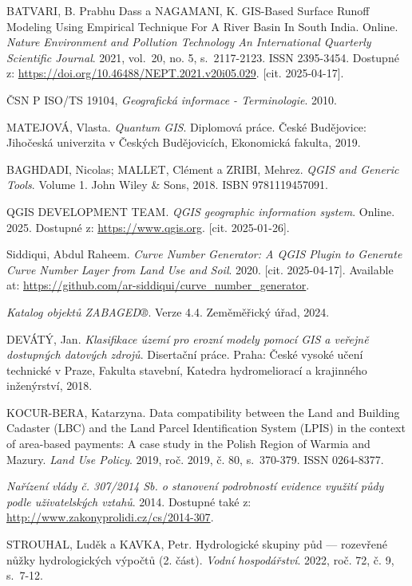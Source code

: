 \documentclass[a4paper,oneside,12pt]{book}
\begin{document}
\begin{thebibliography}{1}
BATVARI, B. Prabhu Dass a NAGAMANI, K. GIS-Based Surface Runoff Modeling Using Empirical Technique For A River Basin In South India. Online. \textit{Nature Environment and Pollution Technology An International Quarterly Scientific Journal}. 2021, vol.~20, no. 5, s.~2117-2123. ISSN 2395-3454. Dostupné z: \url{https://doi.org/10.46488/NEPT.2021.v20i05.029}. [cit. 2025-04-17].


ČSN P ISO/TS 19104, \textit{Geografická informace - Terminologie}. 2010.

MATEJOVÁ, Vlasta. \textit{Quantum GIS}. Diplomová práce. České Budějovice: Jihočeská univerzita v Českých Budějovicích, Ekonomická fakulta, 2019.

BAGHDADI, Nicolas; MALLET, Clément a ZRIBI, Mehrez. \textit{QGIS and Generic Tools}. Volume 1. John Wiley \& Sons, 2018. ISBN 9781119457091.

QGIS DEVELOPMENT TEAM. \textit{QGIS geographic information system}. Online. 2025. Dostupné z: \url{https://www.qgis.org}. [cit. 2025-01-26].

Siddiqui, Abdul Raheem. \textit{Curve Number Generator: A QGIS Plugin to Generate Curve Number Layer from Land Use and Soil}. 2020. [cit. 2025-04-17]. Available at: \url{https://github.com/ar-siddiqui/curve_number_generator}.

\textit{Katalog objektů ZABAGED®}. Verze 4.4. Zeměměřický úřad, 2024.


DEVÁTÝ, Jan. \textit{Klasifikace území pro erozní modely pomocí GIS a veřejně dostupných datových zdrojů}. Disertační práce. Praha: České vysoké učení technické v Praze, Fakulta stavební, Katedra hydromeliorací a krajinného inženýrství, 2018.

KOCUR-BERA, Katarzyna. Data compatibility between the Land and Building Cadaster (LBC) and the Land Parcel Identification System (LPIS) in the context of area-based payments: A case study in the Polish Region of Warmia and Mazury. \textit{Land Use Policy}. 2019, roč. 2019, č. 80, s.~370-379. ISSN 0264-8377.

\textit{Nařízení vlády č. 307/2014 Sb. o stanovení podrobností evidence využití půdy podle uživatelských vztahů}. 2014. Dostupné také z: \url{http://www.zakonyprolidi.cz/cs/2014-307}.

STROUHAL, Luděk a KAVKA, Petr. Hydrologické skupiny půd --- rozevřené nůžky hydrologických výpočtů (2. část). \textit{Vodní hospodářství}. 2022, roč. 72, č. 9, s.~7-12.


\end{thebibliography}
\end{document}
